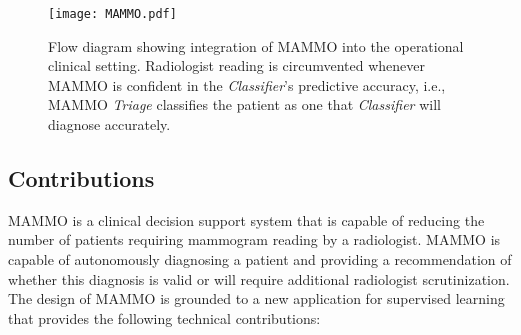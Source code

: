 \documentclass[journal]{IEEEtran}
\begin{document}
\begin{figure}[t]
  \texttt{[image: MAMMO.pdf]}
  \caption{Flow diagram showing integration of MAMMO into the operational clinical setting.  Radiologist reading is circumvented whenever MAMMO is confident in the \textit{Classifier}'s predictive accuracy, i.e., MAMMO \textit{Triage} classifies the patient as one that \textit{Classifier} will diagnose accurately.}
  \label{fig:mammo}
\end{figure}

\subsection{Contributions}

MAMMO is a clinical decision support system that is capable of reducing the number of patients requiring mammogram reading by a radiologist. MAMMO is capable of autonomously diagnosing a patient and providing a recommendation of whether this diagnosis is valid or will require additional radiologist scrutinization.  %
The design of MAMMO is grounded to a new application for supervised learning that provides the following technical contributions:
\end{document}
